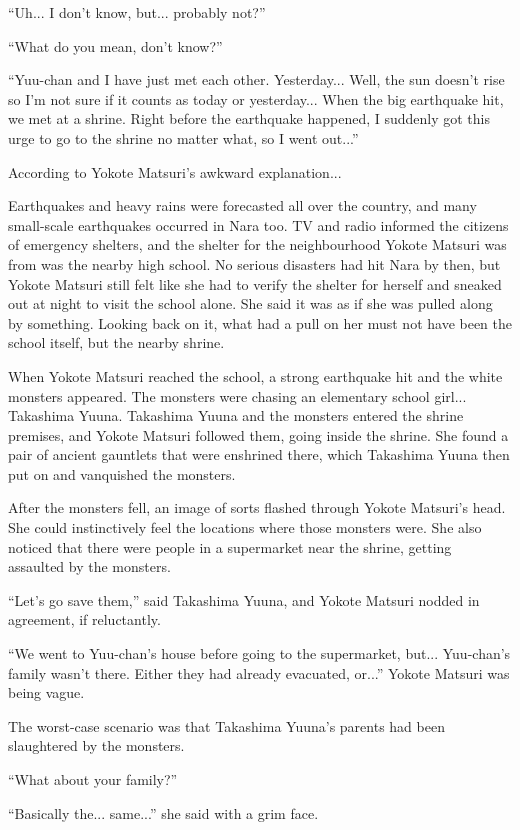 ``Uh... I don't know, but... probably not?''

``What do you mean, don't know?''

``Yuu-chan and I have just met each other. Yesterday... Well, the sun doesn't rise so I'm not sure if it counts as today or yesterday... When the big earthquake hit, we met at a shrine. Right before the earthquake happened, I suddenly got this urge to go to the shrine no matter what, so I went out...''

According to Yokote Matsuri's awkward explanation...

Earthquakes and heavy rains were forecasted all over the country, and many small-scale earthquakes occurred in Nara too. TV and radio informed the citizens of emergency shelters, and the shelter for the neighbourhood Yokote Matsuri was from was the nearby high school.  No serious disasters had hit Nara by then, but Yokote Matsuri still felt like she had to verify the shelter for herself and sneaked out at night to visit the school alone. She said it was as if she was pulled along by something. Looking back on it, what had a pull on her must not have been the school itself, but the nearby shrine.

When Yokote Matsuri reached the school, a strong earthquake hit and the white monsters appeared. The monsters were chasing an elementary school girl... Takashima Yuuna. Takashima Yuuna and the monsters entered the shrine premises, and Yokote Matsuri followed them, going inside the shrine. She found a pair of ancient gauntlets that were enshrined there, which Takashima Yuuna then put on and vanquished the monsters.

After the monsters fell, an image of sorts flashed through Yokote Matsuri's head. She could instinctively feel the locations where those monsters were. She also noticed that there were people in a supermarket near the shrine, getting assaulted by the monsters.

``Let's go save them,'' said Takashima Yuuna, and Yokote Matsuri nodded in agreement, if reluctantly.

``We went to Yuu-chan's house before going to the supermarket, but... Yuu-chan's family wasn't there. Either they had already evacuated, or...'' Yokote Matsuri was being vague.

The worst-case scenario was that Takashima Yuuna's parents had been slaughtered by the monsters.

``What about your family?''

``Basically the... same...'' she said with a grim face.

